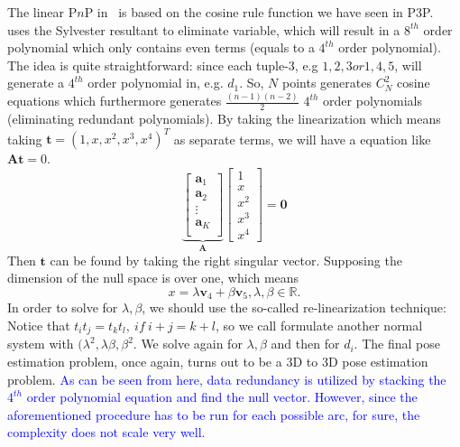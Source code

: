 \documentclass[a4paper]{article}
\begin{document}
The linear P$n$P in~\cite{quan1999linear} is based on the cosine rule function we have seen in P$3$P.~\cite{quan1999linear} uses the Sylvester resultant to eliminate variable, which will result in a $8^{th}$ order polynomial which only contains even terms (equals to a $4^{th}$ order polynomial). The idea is quite straightforward: since each tuple-3, e.g ${1,2,3} or {1,4,5}$, will generate a $4^{th}$ order polynomial in, e.g. $d_1$. So, $N$ points generates $C_{N}^{2}$ cosine equations which furthermore generates $\frac{(n-1)(n-2)}{2}$ $4^{th}$ order polynomials (eliminating redundant polynomials). By taking the linearization which means taking $\mathbf{t}=(1,x,x^2,x^3,x^4)^{T}$ as separate terms, we will have a equation like $\mathbf{A}\mathbf{t}=0$. 
$$
\underbrace{
\left[
\begin{matrix}
\mathbf{a}_1 \\
\mathbf{a}_2 \\
\vdots \\
\mathbf{a}_K \\
\end{matrix}
\right]}_{\mathbf{A}}
\left[
\begin{matrix}
1 \\ x \\ x^2 \\ x^3 \\ x^4
\end{matrix}
\right]=\mathbf{0}
$$
Then $\mathbf{t}$ can be found by taking the right singular vector. Supposing the dimension of the null space is over one, which means 
$$
x = \lambda \mathbf{v}_4 + \beta \mathbf{v}_5, \lambda, \beta \in \mathbb{R}.
$$
In order to solve for $\lambda, \beta$, we should use the so-called re-linearization technique:
Notice that $t_it_j=t_kt_l,\ if\ i+j=k+l$, so we call formulate another normal system with $(\lambda^2, \lambda\beta, \beta^2$. We solve again for $\lambda, \beta$ and then for $d_i$. The final pose estimation problem, once again, turns out to be a $3$D to $3$D pose estimation problem. \textcolor{blue}{As can be seen from here, data redundancy is utilized by stacking the $4^{th}$ order polynomial equation and find the null vector. However, since the aforementioned procedure has to be run for each possible arc, for sure, the complexity does not scale very well.}
\end{document}
